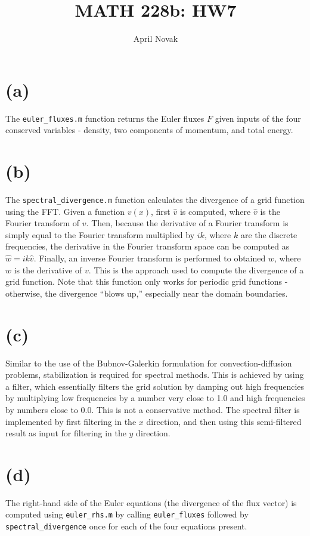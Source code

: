 \documentclass[10pt]{article}
\begin{document}
\title{MATH 228b: HW7}
\author{April Novak}

\maketitle

\section{(a)}
The {\tt euler\_fluxes.m} function returns the Euler fluxes \(F\) given inputs of the four conserved variables - density, two components of momentum, and total energy.

\section{(b)}
The {\tt spectral\_divergence.m} function calculates the divergence of a grid function using the FFT. Given a function \(v(x)\), first \(\hat{v}\) is computed, where \(\hat{v}\) is the Fourier transform of \(v\). Then, because the derivative of a Fourier transform is simply equal to the Fourier transform multiplied by \(ik\), where \(k\) are the discrete frequencies, the derivative in the Fourier transform space can be computed as \(\hat{w}=ik\hat{v}\). Finally, an inverse Fourier transform is performed to obtained \(w\), where \(w\) is the derivative of \(v\). This is the approach used to compute the divergence of a grid function. Note that this function only works for periodic grid functions - otherwise, the divergence ``blows up,'' especially near the domain boundaries.

\section{(c)}
Similar to the use of the Bubnov-Galerkin formulation for convection-diffusion problems, stabilization is required for spectral methods. This is achieved by using a filter, which essentially filters the grid solution by damping out high frequencies by multiplying low frequencies by a number very close to 1.0 and high frequencies by numbers close to 0.0. This is not a conservative method. The spectral filter is implemented by first filtering in the \(x\) direction, and then using this semi-filtered result as input for filtering in the \(y\) direction.

\section{(d)}
The right-hand side of the Euler equations (the divergence of the flux vector) is computed using {\tt euler\_rhs.m} by calling {\tt euler\_fluxes} followed by {\tt spectral\_divergence} once for each of the four equations present.
\end{document}
